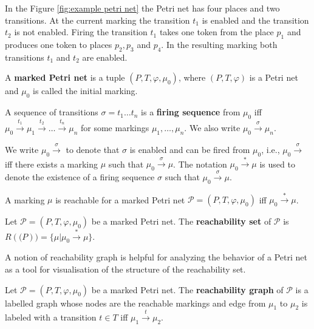 \begin{example}
  In the Figure \ref{fig:example petri net} the Petri net has four places and two transitions. At the current marking the transition $t_1$ is enabled and the transition $t_2$ is not enabled. Firing the transition $t_1$ takes one token from the place $p_1$ and produces one token to places $p_2, p_3$ and $p_4$. In the resulting marking both transitions $t_1$ and $t_2$ are enabled.
\end{example}

\begin{definition}
  A {\bf marked Petri net} is a tuple $(P,T,\varphi,\mu_0)$, where $(P,T,\varphi)$ is a Petri net and $\mu_0$ is called the initial marking.
\end{definition}

\begin{definition}
  A sequence of transitions $\sigma = t_1\ldots t_n$ is a {\bf firing sequence} from $\mu_0$ iff $\mu_0\xrightarrow{t_1}\mu_1\xrightarrow{t_2}\ldots\xrightarrow{t_n}\mu_n$ for some markings $\mu_1,\ldots,\mu_n$. We also write $\mu_0\xrightarrow{\sigma}\mu_n$.
\end{definition}

We write $\mu_0\xrightarrow{\sigma}$ to denote that $\sigma$ is enabled and can be fired from $\mu_0$, i.e., $\mu_0\xrightarrow{\sigma}$ iff there exists a marking $\mu$ such that $\mu_0\xrightarrow{\sigma}\mu$.
The notation $\mu_0\xrightarrow{*}\mu$ is used to denote the existence of a firing sequence $\sigma$ such that $\mu_0\xrightarrow{\sigma}\mu$.

\begin{definition}
  A marking $\mu$ is reachable for a marked Petri net $\mathcal P = (P,T,\varphi,\mu_0)$ iff $\mu_0\xrightarrow{*}\mu$.
\end{definition}

\begin{definition}
  Let $\mathcal P = (P,T,\varphi,\mu_0)$ be a marked Petri net. The {\bf reachability set} of $\mathcal P$ is $R(\mathcal(P)) = \{\mu|\mu_0\xrightarrow{*}\mu\}$.
\end{definition}

A notion of reachability graph is helpful for analyzing the behavior of a Petri net as a tool for visualisation of the structure of the reachability set.

\begin{definition}
  Let $\mathcal P = (P,T,\varphi,\mu_0)$ be a marked Petri net. The {\bf reachability graph} of $\mathcal P$ is a labelled graph whose nodes are the reachable markings and edge from $\mu_1$ to $\mu_2$ is labeled with a transition $t\in T$ iff $\mu_1\xrightarrow{t}\mu_2$.
\end{definition}

